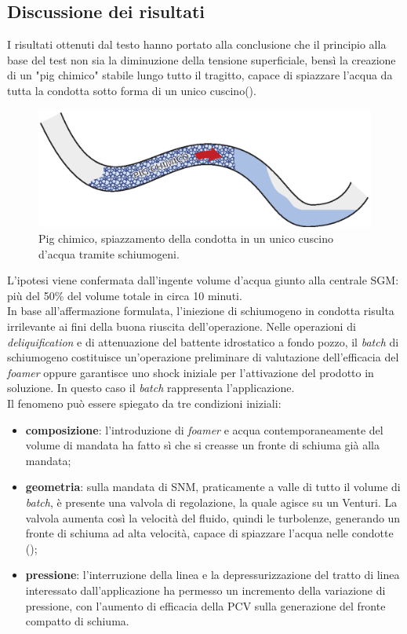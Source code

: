 \subsection{Discussione dei risultati}
I risultati ottenuti dal testo hanno portato alla conclusione che il principio alla base del test non sia la diminuzione della tensione superficiale, bensì la creazione di un "pig chimico" stabile lungo tutto il tragitto, capace di spiazzare l'acqua da tutta la condotta sotto forma di un unico cuscino().\\
\begin{figure}[htbp]
    \centering
    \includegraphics[width=\textwidth]{fig/test/pig-chimico.eps}
    \caption{Pig chimico, spiazzamento della condotta in un unico cuscino d'acqua tramite schiumogeni.} 
    \label{fig:pig-chimico}
\end{figure}
L'ipotesi viene confermata dall'ingente volume d'acqua giunto alla centrale SGM: più del 50\% del volume totale in circa 10 minuti.\\
In base all'affermazione formulata, l'iniezione di schiumogeno in condotta risulta irrilevante ai fini della buona riuscita dell'operazione. Nelle operazioni di \textit{deliquification} e di attenuazione del battente idrostatico a fondo pozzo, il \textit{batch} di schiumogeno costituisce un'operazione preliminare di valutazione dell'efficacia del \textit{foamer} oppure garantisce uno shock iniziale per l'attivazione del prodotto in soluzione. In questo caso il \textit{batch} rappresenta l'applicazione.\\
Il fenomeno può essere spiegato da tre condizioni iniziali:
\begin{itemize}
    \item \textbf{composizione}: l'introduzione di \textit{foamer} e acqua contemporaneamente del volume di mandata ha fatto sì che si creasse un fronte di schiuma già alla mandata;
    \item \textbf{geometria}: sulla mandata di SNM, praticamente a valle di tutto il volume di \textit{batch}, è presente una valvola di regolazione, la quale agisce su un Venturi. La valvola aumenta così la velocità del fluido, quindi le turbolenze, generando un fronte di schiuma ad alta velocità, capace di spiazzare l'acqua nelle condotte ();
    \item \textbf{pressione}: l'interruzione della linea e la depressurizzazione del tratto di linea interessato dall'applicazione ha permesso un incremento della variazione di pressione, con l'aumento di efficacia della PCV sulla generazione del fronte compatto di schiuma.
\end{itemize}
